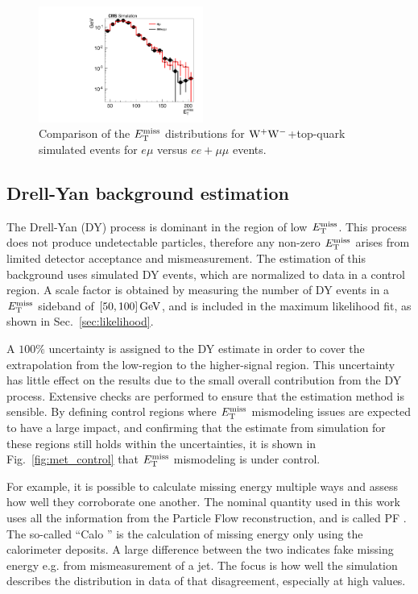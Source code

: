 \begin{figure}[hbtp]
\centering
\includegraphics[width=0.48\textwidth]{figures/met_tt_ww.pdf}
\caption{Comparison of the $E_\mathrm{T}^{\mathrm{miss}}$ distributions for $\mathrm{W}^+\mathrm{W}^-$+top-quark simulated 
events for $e\mu$ versus $ee+\mu\mu$ events.} 
\label{fig:met_tt_ww}
\end{figure}

\newpage
\subsection{Drell-Yan background estimation}
The Drell-Yan (DY) process is dominant in the region of low $E_{\mathrm{T}}^{\text{miss}}$.
This process does not produce undetectable particles, therefore any non-zero $E_{\mathrm{T}}^{\text{miss}}$ arises from
limited detector acceptance and mismeasurement.
The estimation of this background uses simulated DY events, which are normalized to data in a control region.
A scale factor is obtained by measuring the number of DY events in a $E_\mathrm{T}^{\mathrm{miss}}$ sideband of $[50, 100]\,\text{Ge\hspace{-.08em}V}$,
and is included in the maximum likelihood fit, as shown in Sec.~\ref{sec:likelihood}.

A $100\%$ uncertainty is assigned to the DY estimate in order to cover the extrapolation from the low-\met region to the higher-\met signal region.
This uncertainty has little effect on the results due to the small overall contribution from the DY process.
Extensive checks are performed to ensure that the estimation method is sensible.
By defining control regions where $E_\mathrm{T}^{\mathrm{miss}}$ mismodeling issues are expected to have a large impact, and confirming that the 
estimate from simulation for these regions still holds within the uncertainties, it is shown in Fig.~\ref{fig:met_control} that $E_\mathrm{T}^{\mathrm{miss}}$ mismodeling is under control.

For example, it is possible to calculate missing energy multiple ways and assess how well they corroborate one another.
The nominal \met quantity used in this work uses all the information from the Particle Flow reconstruction, and is called PF \met.
The so-called ``Calo \met'' is the calculation of missing energy only using the calorimeter deposits.
A large difference between the two indicates fake missing energy e.g. from mismeasurement of a jet.
The focus is how well the simulation describes the distribution in data of that disagreement, especially at high values.

